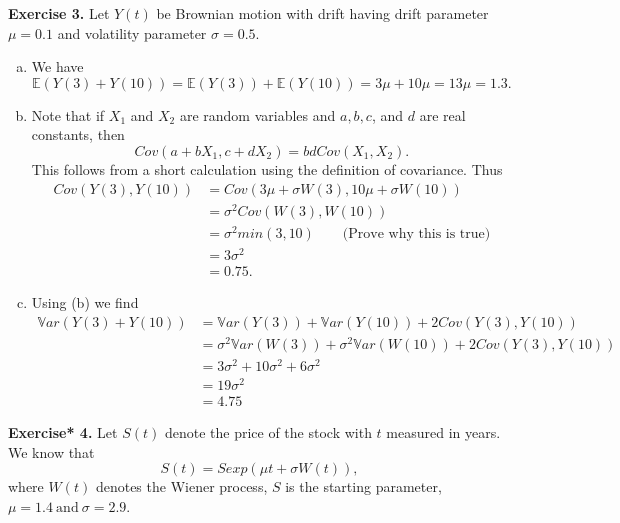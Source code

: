 \documentclass[11pt,a4paper]{report}
\begin{document}
    \textbf{Exercise 3.} Let $Y (t)$ be Brownian motion with drift having drift parameter $\mu = 0.1$ and volatility parameter $\sigma = 0.5$.
    \begin{enumerate}[(a)]
        \item We have
        $$\mathbb{E}(Y (3) + Y (10)) = \mathbb{E}(Y (3)) + \mathbb{E}(Y (10)) = 3\mu + 10\mu = 13\mu = 1.3 .$$
        \item Note that if $X_1$ and $X_2$ are random variables and $a, b, c$, and $d$ are real constants, then
        $$Cov(a + bX_1, c + dX_2) = bd Cov(X_1, X_2).$$
        This follows from a short calculation using the definition of covariance. Thus
        \begin{align*}
            Cov(Y (3), Y (10)) &= Cov(3\mu + \sigma W(3), 10\mu + \sigma W(10))\\
            &= \sigma^2 Cov(W(3), W(10))\\
            &= \sigma^2 min(3, 10) \quad \quad \text{(Prove why this is true)}\\
            &= 3\sigma^2\\
            &= 0.75.
        \end{align*}
        \item Using (b) we find
        \begin{align*}
            \mathbb{V}ar(Y (3) + Y (10)) &= \mathbb{V}ar(Y (3)) + \mathbb{V}ar(Y (10)) + 2Cov(Y (3), Y (10))\\
            &= \sigma^2\mathbb{V}ar(W(3)) + \sigma^2\mathbb{V}ar(W(10))+2Cov(Y (3), Y (10))\\
            &= 3\sigma^2+10\sigma^2+6\sigma^2\\
            &= 19\sigma^2\\
            &= 4.75
        \end{align*}
    \end{enumerate}
    \textbf{Exercise* 4.} Let $S(t)$ denote the price of the stock with $t$ measured in years. We know that
    $$S(t) = S exp(\mu t + \sigma W(t)),$$
    where $W(t)$ denotes the Wiener process, $S$ is the starting parameter, $\mu = 1.4\ \text{and}\ \sigma = 2.9$.
\end{document}
